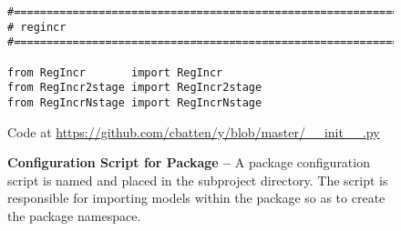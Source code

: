 
\begin{figure}

  \begin{lstlisting}[xleftmargin={0.9in}]
#=========================================================================
# regincr
#=========================================================================

from RegIncr       import RegIncr
from RegIncr2stage import RegIncr2stage
from RegIncrNstage import RegIncrNstage
\end{lstlisting}

  \centerline{\small Code at
    \url{https://github.com/cbatten/y/blob/master/__init__.py}}

  \caption{\textbf{Configuration Script for  Package --} A
    package configuration script is named  and placed
    in the subproject directory. The script is responsible for importing
    models within the package so as to create the package namespace.}
  \label{code-tut3-regincr-pkg}

\end{figure}

